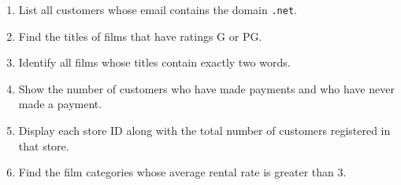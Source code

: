 \documentclass[12pt,a4paper]{article}
\newif\ifshowsolutions
\begin{document}
\begin{enumerate}

    \item List all customers whose email contains the domain \texttt{.net}.

    \ifshowsolutions
    \begin{lstlisting}[language=SQL]
    SELECT first_name, last_name, email
    FROM customer
    WHERE email LIKE '%.net%';
    \end{lstlisting}
    \fi

    \item Find the titles of films that have ratings G or PG.

    \ifshowsolutions
    \begin{lstlisting}[language=SQL]
    SELECT title
    FROM film
    WHERE rating IN ('G', 'PG');
    \end{lstlisting}
    \fi

    \item Identify all films whose titles contain exactly two words.

    \ifshowsolutions
    \begin{lstlisting}[language=SQL]
    SELECT title
    FROM film
    WHERE LENGTH(TRIM(title)) - LENGTH(REPLACE(TRIM(title), ' ', '')) = 1;
    \end{lstlisting}
    \fi

    \item Show the number of customers who have made payments and who have never made a payment.

    \ifshowsolutions
    \begin{lstlisting}[language=SQL]
    SELECT
    (SELECT COUNT(DISTINCT customer_id) FROM payment) AS paid,
    (SELECT COUNT(*) 
     FROM customer
     WHERE customer_id NOT IN (
         SELECT customer_id FROM payment
     )) AS unpaid;
    \end{lstlisting}
    \fi

    \item Display each store ID along with the total number of customers registered in that store.

    \ifshowsolutions
    \begin{lstlisting}[language=SQL]
    SELECT store_id, COUNT(*) AS total_customers
    FROM customer
    GROUP BY store_id;
    \end{lstlisting}
    \fi

    \item Find the film categories whose average rental rate is greater than 3.


\end{enumerate}
\end{document}
